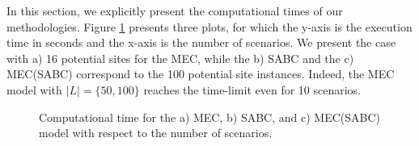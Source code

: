 In this section, we explicitly present the computational times of our methodologies. Figure \ref{M1M2Time} presents three plots, for which the y-axis is the execution time in seconds and the x-axis is the number of scenarios. We present the case with a) 16 potential sites for the MEC, while the b) SABC and the c) MEC(SABC) correspond to the 100 potential site instances. Indeed, the MEC model with $|L|=\{50,100\}$ reaches the time-limit even for 10 scenarios. 
\begin{figure}[!tb]
  \begin{center}
    \caption{Computational time for the a) MEC, b) SABC, and c) MEC(SABC) model with respect to the number of scenarios.}
    \label{M1M2Time}
  \end{center}
\end{figure}


